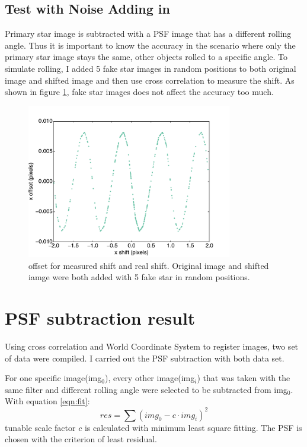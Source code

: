 \documentclass[paper=letter, fontsize=11pt]{scrartcl} %
\numberwithin{equation}{section} %
\numberwithin{figure}{section} %
\numberwithin{table}{section} %
\begin{document}
\subsection{Test with Noise Adding in}
Primary star image is subtracted with a PSF image that has a different
rolling angle. Thus it is important to know the accuracy in the
scenario  where only the primary star image stays the same, other
objects rolled to a specific angle. To simulate rolling, I added 5 fake
star images in random positions to both original image and shifted
image and then use cross correlation to measure the shift. As shown in
figure \ref{fig:shift2}, fake star images does not affect the
accuracy too much.

\begin{figure}[h]
      \centering
      \includegraphics[width=0.8\textwidth]{crosscorr_cenWithNoise}
      \caption{offset for measured shift and real shift. Original
        image and shifted iamge were both added with 5 fake star in
        random positions.}
      \label{fig:shift2}
    \end{figure}

 \section{PSF subtraction result}
Using cross correlation and  World Coordinate System to register
images, two set of data were compiled. I carried out the PSF
subtraction with both data set.\par

For one specific image(img$_{0}$), every other image(img$_{i}$) that was taken with the same
filter and different rolling angle were selected to be
subtracted from img$_{0}$. With equation \ref{eqn:fit}:
\begin{equation}
  \label{eqn:fit}
  res = \sum(img_{0} - c\cdot img_{i})^{2}
\end{equation}
tunable scale factor $c$ is calculated with minimum least square
fitting. The PSF is chosen with the criterion of least residual. \par
\end{document}
